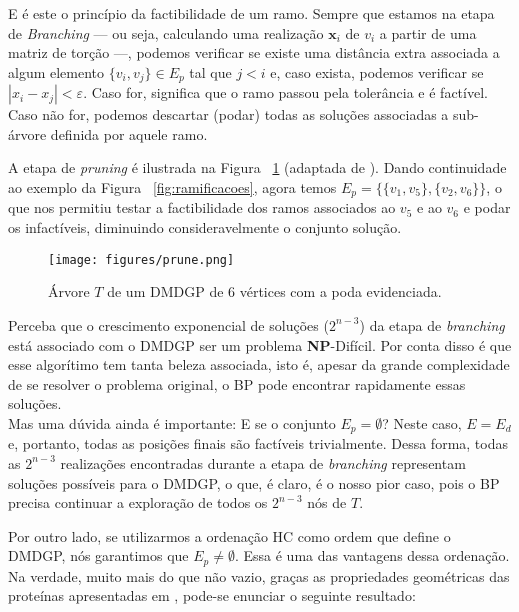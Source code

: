 E é este o princípio da factibilidade de um ramo. Sempre que estamos na etapa de \textit{Branching} --- ou seja, calculando uma realização $\mathbf x_i$ de $v_i$ a partir de uma matriz de torção ---, podemos verificar se existe uma distância extra associada a algum elemento $\{v_i,v_j\} \in E_p$ tal que $j < i$ e, caso exista, podemos verificar se $|x_i - x_j| < \varepsilon$. Caso for, significa que o ramo passou pela tolerância e é factível. Caso não for, podemos descartar (podar) todas as soluções associadas a sub-árvore definida por aquele ramo.

A etapa de \textit{pruning} é ilustrada na Figura ~\ref{fig:poda} (adaptada de \cite{fidalgotese}). Dando continuidade ao exemplo da Figura ~\ref{fig:ramificacoes}, agora temos $E_p = \{\{v_1,v_5\},\{v_2,v_6\}\}$, o que nos permitiu testar a factibilidade dos ramos associados ao $v_5$ e ao $v_6$ e podar os infactíveis, diminuindo consideravelmente o conjunto solução.

\begin{figure}[H]
	\begin{center}
		\texttt{[image: figures/prune.png]}
	\end{center}
	\caption{Árvore $T$ de um DMDGP de 6 vértices com a poda evidenciada.}
	\label{fig:poda}
\end{figure}

Perceba que o crescimento exponencial de soluções ($2^{n-3}$) da etapa de \textit{branching} está associado com o DMDGP ser um problema \textbf{NP}-Difícil. Por conta disso é que esse algorítimo tem tanta beleza associada, isto é, apesar da grande complexidade de se resolver o problema original, o BP pode encontrar rapidamente essas soluções.
\\

Mas uma dúvida ainda é importante: E se o conjunto $E_p = \emptyset$? Neste caso, $E = E_d$ e, portanto, todas as posições finais são factíveis trivialmente. Dessa forma, todas as $2^{n-3}$ realizações encontradas durante a etapa de \textit{branching} representam soluções possíveis para o DMDGP, o que, é claro, é o nosso pior caso, pois o BP precisa continuar a exploração de todos os $2^{n-3}$ nós de $T$. 

Por outro lado, se utilizarmos a ordenação HC como ordem que define o DMDGP, nós garantimos que $E_p \neq \emptyset$. Essa é uma das vantagens dessa ordenação. Na verdade, muito mais do que não vazio, graças as propriedades geométricas das proteínas apresentadas em \cite{carlile:MinimalOrder}, pode-se enunciar o seguinte resultado: 

